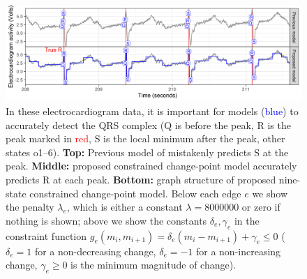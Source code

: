 \documentclass[12pt]{article}
\begin{document}
\begin{figure}[h]
    \centering
    \includegraphics[width=\textwidth]{figure-one-ecg-graph-data}
    
    
    \vskip -0.5cm
    \caption{In these electrocardiogram data, it is important for
      models (\textcolor{blue}{blue}) to accurately detect the QRS
      complex (Q is before the peak, R is the peak marked in
      \textcolor{red}{red}, S is the local minimum after the peak,
      other states o1--6). \textbf{Top:} Previous model of
      \citet{PanTompkins1985} mistakenly predicts S at the
      peak. \textbf{Middle:} proposed constrained change-point model
      accurately predicts R at each peak.  \textbf{Bottom:} graph
      structure of proposed nine-state constrained change-point model.
      Below each edge $e$ we show the penalty $\lambda_e$, which is
      either a constant $\lambda=8000000$ or zero if nothing is shown; above
      we show the constants $\delta_e,\gamma_e$ in the constraint
      function
      $g_e(m_i,m_{i+1})= \delta_e(m_i - m_{i+1})+\gamma_e\leq 0$
      ($\delta_e=1$ for a non-decreasing change, $\delta_e=-1$ for a
      non-increasing change, $\gamma_e \geq 0$ is the minimum
      magnitude of change).
  }
\end{figure}



\end{document}
